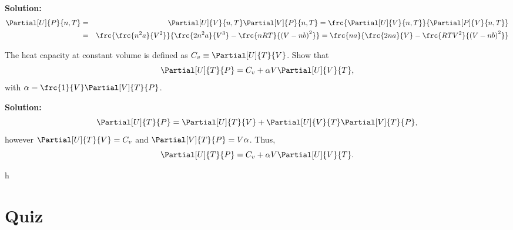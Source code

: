 \begin{list}{\bf Example :~}{}
\medskip
{\bf Solution:}
   \begin{eqnarray}
      \Partial[U]{P}{n,T} &=& \Partial[U]{V}{n,T}\Partial[V]{P}{n,T} = \frc{\Partial[U]{V}{n,T}}{\Partial[P]{V}{n,T}} \nonumber \\
                          &=& \frc{\frc{n^{2}a}{V^{2}}}{\frc{2n^{2}a}{V^{3}}-\frc{n R T}{\left(V-nb\right)^{2}}} = \frc{n a}{\frc{2 n a}{V}-\frc{R T V^{2}}{\left(V-nb\right)^{2}}}\nonumber
   \end{eqnarray}
      
%
     \item\label{example3} The heat capacity at constant volume is defined as $C_{v}\equiv \Partial[U]{T}{V}$. Show that
       \begin{displaymath}
          \Partial[U]{T}{P} = C_{v} + \alpha V\Partial[U]{V}{T},
       \end{displaymath}
       with $\alpha=\frc{1}{V}\Partial[V]{T}{P}$.

%
\medskip
       {\bf Solution:}
          \begin{displaymath}
            \Partial[U]{T}{P} = \Partial[U]{T}{V} + \Partial[U]{V}{T}\Partial[V]{T}{P},
          \end{displaymath}
          however $\Partial[U]{T}{V}=C_{v}$ and $\Partial[V]{T}{P}=V\alpha$. Thus,
          \begin{displaymath}
             \Partial[U]{T}{P} = C_{v} + \alpha V\Partial[U]{V}{T}.
          \end{displaymath}

%
     \item\label{example4} h
%
\end{list}

\pagebreak

\section{Quiz}

